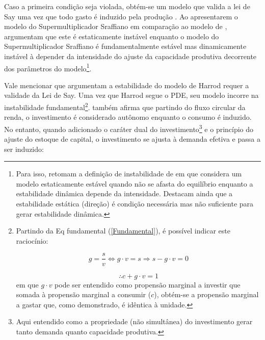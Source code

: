 Caso a primeira condição seja violada, obtém-se um modelo que valida a lei de Say uma vez que todo gasto é induzido pela produção \cite[p.~ 75]{serrano_sraffian_1995}. Ao apresentarem o modelo do Supermultiplicador Sraffiano em comparação ao modelo de \textcite{harrod_essay_1939}, \textcite{serrano_trouble_2017} argumentam que este é estaticamente instável enquanto o modelo do Supermultiplicador Sraffiano é fundamentalmente estável mas dinamicamente instável à depender da intensidade do ajuste da capacidade produtiva decorrente dos parâmetros do modelo\footnote{Para isso, retomam a definição de instabilidade de \textcite{hicks_contribution_1972} em que considera um modelo estaticamente estável quando não se afasta do equilíbrio enquanto a estabilidade dinâmica depende da intensidade. Destacam ainda que a estabilidade estática (direção) é condição necessária mas não suficiente para gerar estabilidade dinâmica.}.

Vale mencionar que \textcite{serrano_trouble_2017} argumentam a estabilidade do modelo de Harrod requer a validade da Lei de Say. Uma vez que Harrod segue o PDE, seu modelo incorre na instabilidade fundamental\footnote{Partindo da Eq fundamental (\ref{Fundamental}), é possível indicar este raciocínio:

$$
g = \frac{s}{v} \Leftrightarrow g\cdot v = s \Rightarrow s - g\cdot v = 0
$$

$$
\therefore c + g\cdot v = 1
$$
em que $g\cdot v$ pode ser entendido como propensão marginal a investir que somada à propensão marginal a consumir ($c$), obtém-se a propensão marginal a gastar que, como demonstrado, é idêntica à unidade.}. \textcite{serrano_long_1995} também afirma que partindo do fluxo circular da renda, o investimento é considerado autônomo enquanto o consumo é induzido. No entanto, quando adicionado o caráter dual do investimento\footnote{Aqui entendido  como a propriedade (não simultânea) do investimento gerar tanto demanda quanto capacidade produtiva.} e o princípio do ajuste do estoque de capital, o investimento se ajusta à demanda efetiva e passa a ser induzido:

